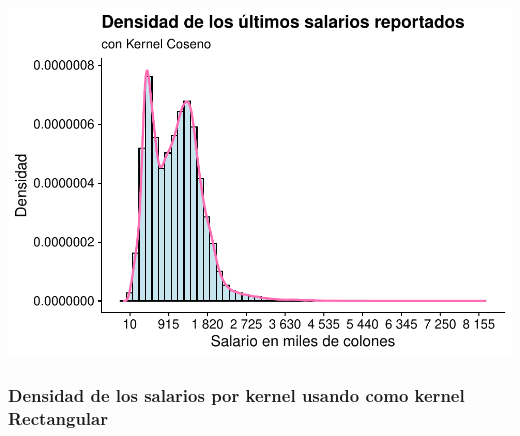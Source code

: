 \documentclass[
]{article}
\begin{document}
\includegraphics{mientras_files/figure-latex/unnamed-chunk-16-1.pdf}

\hypertarget{densidad-de-los-salarios-por-kernel-usando-como-kernel-rectangular}{%
\subsubsection{Densidad de los salarios por kernel usando como kernel
Rectangular}\label{densidad-de-los-salarios-por-kernel-usando-como-kernel-rectangular}}
\end{document}
